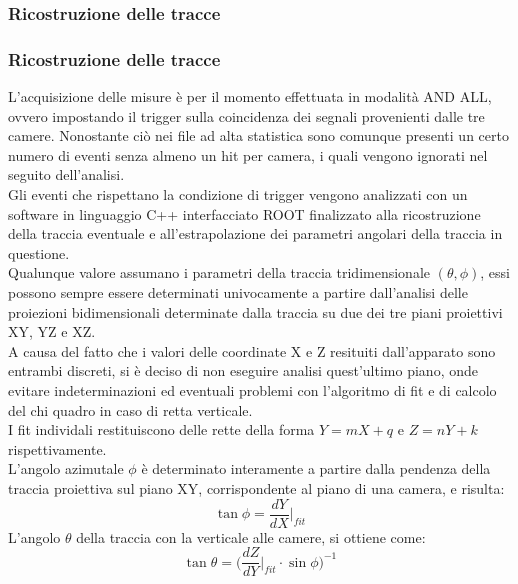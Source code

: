\documentclass[8pt]{extarticle}
\begin{document}
\subsubsection{Ricostruzione delle tracce}



\subsubsection{Ricostruzione delle tracce} \label{subsub:algoritmo}
L’acquisizione delle misure è per il momento effettuata in modalità AND ALL, ovvero impostando il trigger sulla coincidenza dei segnali provenienti dalle tre camere. Nonostante ciò nei file ad alta statistica sono comunque presenti un certo numero di eventi senza almeno un hit per camera, i quali vengono ignorati nel seguito dell’analisi.\\
Gli eventi che rispettano la condizione di trigger vengono analizzati con un software in linguaggio C++ interfacciato ROOT finalizzato alla ricostruzione della traccia eventuale e all’estrapolazione dei parametri angolari della traccia in questione.\\

Qualunque valore assumano i parametri della traccia tridimensionale $(\theta, \phi)$, essi possono sempre essere determinati univocamente a partire dall'analisi delle proiezioni bidimensionali determinate dalla traccia su due dei tre piani proiettivi XY, YZ e XZ. \\
A causa del fatto che i valori delle coordinate X e Z resituiti dall'apparato sono entrambi discreti, si è deciso di non eseguire analisi quest’ultimo piano, onde evitare indeterminazioni ed eventuali problemi con l'algoritmo di fit e di calcolo del chi quadro in caso di retta verticale.\\
I fit individali restituiscono delle rette della forma $Y=mX+q$ e $Z=nY+k$ rispettivamente.
\\
L'angolo azimutale $\phi$ è determinato interamente a partire dalla pendenza della traccia proiettiva sul piano XY, corrispondente al piano di una camera, e risulta:\[\tan{\phi}=\frac{dY}{dX}\biggr\rvert_{fit}\]
L'angolo $\theta$ della traccia con la verticale alle camere, si ottiene come:
\begin{equation}
\tan{\theta}=\Bigg(\frac{dZ}{dY}\biggr\rvert_{fit}\!\!\!\cdot \sin{\phi}\Bigg)^{-1}
\end{equation}
\end{document}
